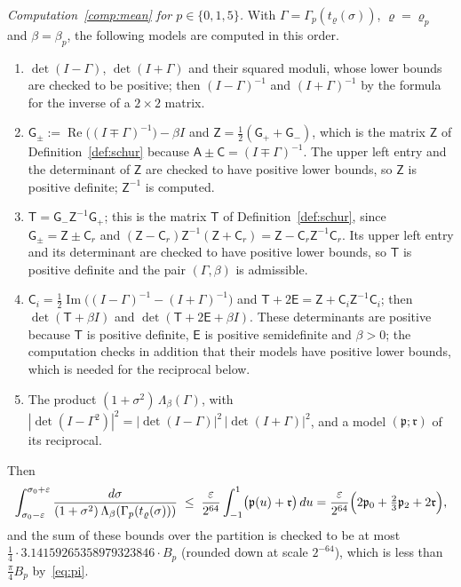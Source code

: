 \documentclass[11pt,reqno]{amsart}
\theoremstyle{definition}
\numberwithin{equation}{section}
\newcommand{\sA}{\mathsf{A}}
\newcommand{\sC}{\mathsf{C}}
\newcommand{\sZ}{\mathsf{Z}}
\newcommand{\sT}{\mathsf{T}}
\newcommand{\sE}{\mathsf{E}}
\DeclareMathOperator{\RePart}{Re}
\DeclareMathOperator{\ImPart}{Im}
\begin{document}
\emph{Computation~\ref{comp:mean} for $p\in\{0,1,5\}$.} With $\Gamma=\Gamma_p(t_\varrho(\sigma))$, $\varrho=\varrho_p$ and $\beta=\beta_p$, the following models are computed in this order.
\begin{enumerate}
  \item $\det(I-\Gamma)$, $\det(I+\Gamma)$ and their squared moduli, whose lower bounds are checked to be positive; then $(I-\Gamma)^{-1}$ and $(I+\Gamma)^{-1}$ by the formula for the inverse of a $2\times2$ matrix.
  \item $\mathsf{G}_\pm:=\RePart\bigl((I\mp\Gamma)^{-1}\bigr)-\beta I$ and $\sZ=\frac12(\mathsf{G}_++\mathsf{G}_-)$, which is the matrix $\sZ$ of Definition~\ref{def:schur} because $\sA\pm\sC=(I\mp\Gamma)^{-1}$. The upper left entry and the determinant of $\sZ$ are checked to have positive lower bounds, so $\sZ$ is positive definite; $\sZ^{-1}$ is computed.
  \item $\sT=\mathsf{G}_-\sZ^{-1}\mathsf{G}_+$; this is the matrix $\sT$ of Definition~\ref{def:schur}, since $\mathsf{G}_\pm=\sZ\pm\sC_r$ and $(\sZ-\sC_r)\sZ^{-1}(\sZ+\sC_r)=\sZ-\sC_r\sZ^{-1}\sC_r$. Its upper left entry and its determinant are checked to have positive lower bounds, so $\sT$ is positive definite and the pair $(\Gamma,\beta)$ is admissible.
  \item $\sC_i=\frac12\ImPart\bigl((I-\Gamma)^{-1}-(I+\Gamma)^{-1}\bigr)$ and $\sT+2\sE=\sZ+\sC_i\sZ^{-1}\sC_i$; then $\det(\sT+\beta I)$ and $\det(\sT+2\sE+\beta I)$. These determinants are positive because $\sT$ is positive definite, $\sE$ is positive semidefinite and $\beta>0$; the computation checks in addition that their models have positive lower bounds, which is needed for the reciprocal below.
  \item The product $(1+\sigma^2)\,\Lambda_\beta(\Gamma)$, with $|\det(I-\Gamma^2)|^2=|\det(I-\Gamma)|^2\,|\det(I+\Gamma)|^2$, and a model $(\mathfrak{p};\mathfrak{r})$ of its reciprocal.
\end{enumerate}
Then
\begin{equation}\label{eq:leaf-int}
  \int_{\sigma_0-\varepsilon}^{\sigma_0+\varepsilon}\frac{d\sigma}{(1+\sigma^2)\,\Lambda_\beta(\Gamma_p(t_\varrho(\sigma)))}\;\le\;\frac{\varepsilon}{2^{64}}\int_{-1}^1\bigl(\mathfrak{p}(u)+\mathfrak{r}\bigr)\,du=\frac{\varepsilon}{2^{64}}\Bigl(2\mathfrak{p}_0+\tfrac23\mathfrak{p}_2+2\mathfrak{r}\Bigr),
\end{equation}
and the sum of these bounds over the partition is checked to be at most $\frac14\cdot3.14159265358979323846\cdot B_p$ (rounded down at scale $2^{-64}$), which is less than $\frac\pi4B_p$ by~\eqref{eq:pi}.
\end{document}
